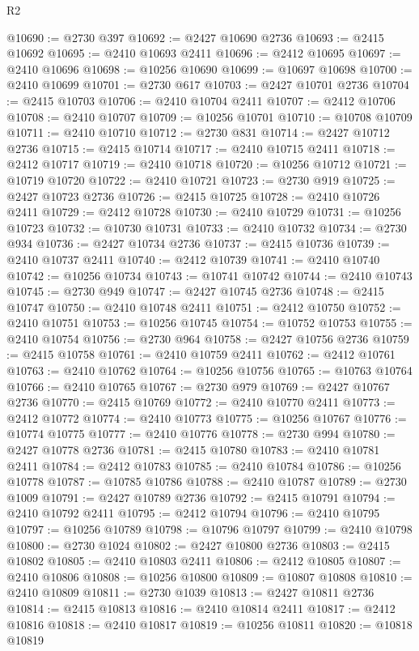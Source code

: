 \begin{lexlean}{R2}
\begin{coremodule}
@10690 := @2730 @397
@10692 := @2427 @10690 @2736
@10693 := @2415 @10692
@10695 := @2410 @10693 @2411
@10696 := @2412 @10695
@10697 := @2410 @10696
@10698 := @10256 @10690
@10699 := @10697 @10698
@10700 := @2410 @10699
@10701 := @2730 @617
@10703 := @2427 @10701 @2736
@10704 := @2415 @10703
@10706 := @2410 @10704 @2411
@10707 := @2412 @10706
@10708 := @2410 @10707
@10709 := @10256 @10701
@10710 := @10708 @10709
@10711 := @2410 @10710
@10712 := @2730 @831
@10714 := @2427 @10712 @2736
@10715 := @2415 @10714
@10717 := @2410 @10715 @2411
@10718 := @2412 @10717
@10719 := @2410 @10718
@10720 := @10256 @10712
@10721 := @10719 @10720
@10722 := @2410 @10721
@10723 := @2730 @919
@10725 := @2427 @10723 @2736
@10726 := @2415 @10725
@10728 := @2410 @10726 @2411
@10729 := @2412 @10728
@10730 := @2410 @10729
@10731 := @10256 @10723
@10732 := @10730 @10731
@10733 := @2410 @10732
@10734 := @2730 @934
@10736 := @2427 @10734 @2736
@10737 := @2415 @10736
@10739 := @2410 @10737 @2411
@10740 := @2412 @10739
@10741 := @2410 @10740
@10742 := @10256 @10734
@10743 := @10741 @10742
@10744 := @2410 @10743
@10745 := @2730 @949
@10747 := @2427 @10745 @2736
@10748 := @2415 @10747
@10750 := @2410 @10748 @2411
@10751 := @2412 @10750
@10752 := @2410 @10751
@10753 := @10256 @10745
@10754 := @10752 @10753
@10755 := @2410 @10754
@10756 := @2730 @964
@10758 := @2427 @10756 @2736
@10759 := @2415 @10758
@10761 := @2410 @10759 @2411
@10762 := @2412 @10761
@10763 := @2410 @10762
@10764 := @10256 @10756
@10765 := @10763 @10764
@10766 := @2410 @10765
@10767 := @2730 @979
@10769 := @2427 @10767 @2736
@10770 := @2415 @10769
@10772 := @2410 @10770 @2411
@10773 := @2412 @10772
@10774 := @2410 @10773
@10775 := @10256 @10767
@10776 := @10774 @10775
@10777 := @2410 @10776
@10778 := @2730 @994
@10780 := @2427 @10778 @2736
@10781 := @2415 @10780
@10783 := @2410 @10781 @2411
@10784 := @2412 @10783
@10785 := @2410 @10784
@10786 := @10256 @10778
@10787 := @10785 @10786
@10788 := @2410 @10787
@10789 := @2730 @1009
@10791 := @2427 @10789 @2736
@10792 := @2415 @10791
@10794 := @2410 @10792 @2411
@10795 := @2412 @10794
@10796 := @2410 @10795
@10797 := @10256 @10789
@10798 := @10796 @10797
@10799 := @2410 @10798
@10800 := @2730 @1024
@10802 := @2427 @10800 @2736
@10803 := @2415 @10802
@10805 := @2410 @10803 @2411
@10806 := @2412 @10805
@10807 := @2410 @10806
@10808 := @10256 @10800
@10809 := @10807 @10808
@10810 := @2410 @10809
@10811 := @2730 @1039
@10813 := @2427 @10811 @2736
@10814 := @2415 @10813
@10816 := @2410 @10814 @2411
@10817 := @2412 @10816
@10818 := @2410 @10817
@10819 := @10256 @10811
@10820 := @10818 @10819

\end{coremodule}
\end{lexlean}
